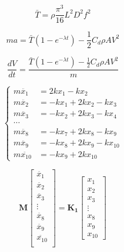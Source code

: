 \documentclass[12pt]{article}
\begin{document}
\begin{equation}
    \bar{T}=\rho \frac{\pi ^3}{16}L^2D^2f^2
\end{equation}

\begin{equation}
    ma = \bar{T} \left( 1-e^{-\lambda t} \right) - \frac{1}{2}C_d\rho AV^2
\end{equation}

\begin{equation}
    \frac{dV}{dt} = \frac{\bar{T} \left( 1-e^{-\lambda t} \right) - \frac{1}{2}C_d\rho AV^2}{m}
\end{equation}

\begin{equation}
    \begin{cases}
        m \ddot{x_1} &= 2kx_1 - kx_2 \\
        m \ddot{x_2} &= -kx_1 + 2kx_2 - kx_3 \\
        m \ddot{x_3} &= -kx_2 + 2kx_3 - kx_4 \\
        \cdots \\
        m \ddot{x_8} &= -kx_7 + 2kx_8 - kx_9 \\
        m \ddot{x_9} &= -kx_8 + 2kx_9 - kx_{10} \\
        m \ddot{x_{10}} &= -kx_9 + 2kx_{10}
    \end{cases}
\end{equation}

\begin{equation}
    \mathbf{M}
    \begin{bmatrix}
        \ddot{x_1} \\
        \ddot{x_2} \\
        \ddot{x_3} \\
        \vdots \\
        \ddot{x_8} \\
        \ddot{x_9} \\
        \ddot{x_{10}} \\
    \end{bmatrix}
    =
    \mathbf{K_1}
    \begin{bmatrix}
        x_1 \\
        x_2 \\
        x_3 \\
        \vdots \\
        x_8 \\
        x_9 \\
        x_{10}
    \end{bmatrix}
\end{equation}
\end{document}
